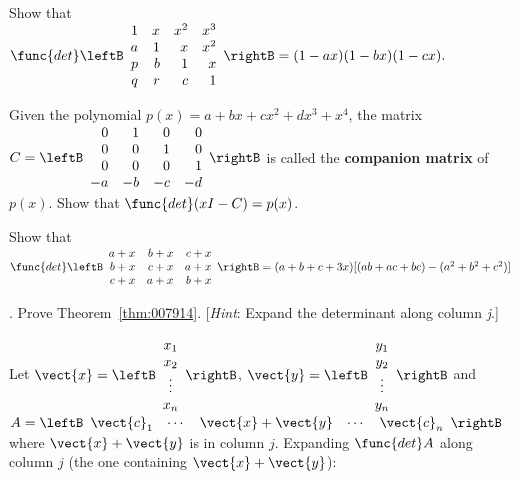 \begin{multicols}{2}
\begin{ex}
Show that \\$\func{det} \leftB \begin{array}{rrrr}
1 & x & x^2 & x^3  \\
a & 1 & x & x^2 \\
p & b & 1 & x \\
q & r & c & 1 
\end{array}\rightB = (1-ax)(1-bx)(1-cx).$
\end{ex}

\begin{ex} \label{ex:3.1.19}
\newline Given the polynomial $p(x) = a + bx + cx^2 + dx^3 + x^4$, the matrix $C = \leftB \begin{array}{rrrr}
0 & 1 & 0 & 0 \\
0 & 0 & 1 & 0 \\
0 & 0 & 0 & 1 \\
-a & -b & -c & -d 
\end{array}\rightB$
 is called the \textbf{companion matrix} of $p(x)$. Show that $\func{det}(xI - C) = p(x)$.
\end{ex}

\begin{ex}
Show that \\ $\func{det} \leftB \begin{array}{rrr}
a+x & b+x & c+x   \\
b+x & c+x & a+x  \\
c+x & a+x & b+x  
\end{array}\rightB \\ = (a+b+c+3x)[(ab+ac+bc)-(a^2+b^2+c^2)]$
\end{ex}

\begin{ex}\label{ex:3_1_21}.
Prove Theorem~\ref{thm:007914}. [\textit{Hint}: Expand the determinant along column \textit{j}.] 

\begin{sol}
Let $\vect{x} = \leftB \begin{array}{c}
x_1 \\
x_2 \\
\vdots \\
x_n
\end{array} \rightB$,  $\vect{y} = \leftB \begin{array}{c}
y_1 \\
y_2 \\
\vdots \\
y_n
\end{array} \rightB$ 
 and $A = \leftB \begin{array}{ccccc} \vect{c}_1 & \cdots & \vect{x} + \vect{y}& \cdots & \vect{c}_n \end{array}\rightB$ where $\vect{x} + \vect{y}$ is in column $j$. Expanding $\func{det } A$ along column $j$ (the one containing $\vect{x} + \vect{y}$):


\end{sol}
\end{ex}
\end{multicols}
